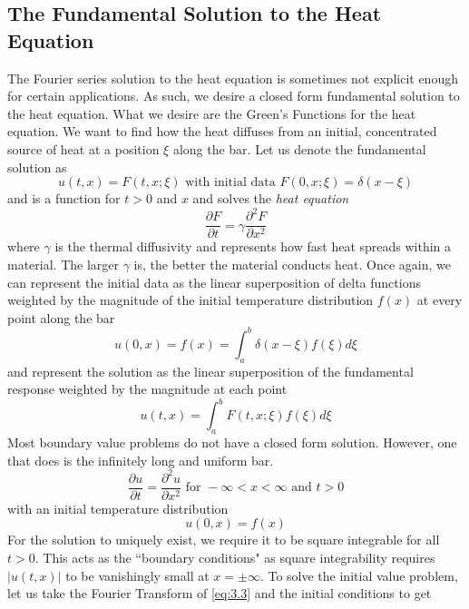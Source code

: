 \documentclass{article}
\newcommand{\pd}[2]{\frac{\partial #1}{\partial #2}}
\newcommand{\pdt}[2]{\frac{\partial ^2 #1}{\partial #2 ^2}}
\numberwithin{equation}{section}
\begin{document}
\subsection{The Fundamental Solution to the Heat Equation} 
The Fourier series solution to the heat equation is sometimes not explicit enough for certain applications. As such, we desire a closed form fundamental solution to the heat equation. What we desire are the Green's Functions for the heat equation. We want to find how the heat diffuses from an initial, concentrated source of heat at a position $\xi$ along the bar. Let us denote the fundamental solution as 
\begin{equation}
    u(t,x) = F(t,x;\xi) \text{ with initial data } F(0,x;\xi) = \delta(x-\xi)
\end{equation}
and is a function for $t>0$ and $x$ and solves the \textit{heat equation} 
\begin{equation}
    \pd{F}{t} = \gamma \pdt{F}{x} \label{eq:heat}
\end{equation}
where $\gamma$ is the thermal diffusivity and represents how fast heat spreads within a material. The larger $\gamma$ is, the better the material conducts heat. Once again, we can represent the initial data as the linear superposition of delta functions weighted by the magnitude of the initial temperature distribution $f(x)$ at every point along the bar
\begin{equation*}
    u(0,x) = f(x) =\int^b_a \delta(x-\xi) f(\xi)d\xi
\end{equation*}
and represent the solution as the linear superposition of the fundamental response weighted by the magnitude at each point
\begin{equation*}
    u(t,x) = \int^b_aF(t,x;\xi)f(\xi)d\xi
\end{equation*}
Most boundary value problems do not have a closed form solution. However, one that does is the infinitely long and uniform bar.
\begin{equation}
    \pd{u}{t} = \pdt{u}{x} \text{ for } -\infty<x<\infty \text{ and } t>0 \label{eq:3.3}
\end{equation}
with an initial temperature distribution 
\begin{equation*}
    u(0,x) = f(x)
\end{equation*}
For the solution to uniquely exist, we require it to be square integrable for all $t>0$. This acts as the ``boundary conditions" as square integrability requires $|u(t,x)|$ to be vanishingly small at $x=\pm \infty$. To solve the initial value problem, let us take the Fourier Transform of \eqref{eq:3.3} and the initial conditions to get 
\end{document}
